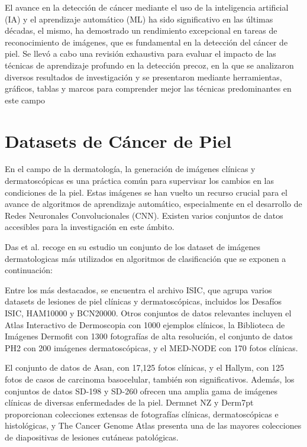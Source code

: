 El avance en la detección de cáncer mediante el uso de la inteligencia artificial (IA) y el aprendizaje automático (ML) ha sido significativo en 
las últimas décadas, el mismo, ha demostrado un rendimiento excepcional en tareas de reconocimiento de imágenes, que es fundamental en la detección 
del cáncer de piel. Se llevó a cabo una revisión exhaustiva para evaluar el impacto de las técnicas de aprendizaje profundo en la detección precoz, 
en la que se analizaron diversos resultados de investigación y se presentaron mediante herramientas, gráficos, tablas y marcos para comprender mejor 
las técnicas predominantes en este campo 

\section*{Datasets de Cáncer de Piel}

En el campo de la dermatología, la generación de imágenes clínicas y dermatoscópicas es una práctica común para supervisar los cambios en las condiciones de la piel. Estas imágenes se han vuelto un recurso crucial para el avance de algoritmos de aprendizaje automático, especialmente en el desarrollo de Redes Neuronales Convolucionales (CNN). Existen varios conjuntos de datos accesibles para la investigación en este ámbito.

Das et al.  recoge en su estudio un conjunto de los dataset de imágenes dermatologicas más utilizados en algoritmos de clasificación que se exponen a continuación:

Entre los más destacados, se encuentra el archivo ISIC, que agrupa varios datasets de lesiones de piel clínicas y dermatoscópicas, incluidos los Desafíos ISIC, HAM10000 y BCN20000. Otros conjuntos de datos relevantes incluyen el Atlas Interactivo de Dermoscopia con 1000 ejemplos clínicos, la Biblioteca de Imágenes Dermofit con 1300 fotografías de alta resolución, el conjunto de datos PH2 con 200 imágenes dermatoscópicas, y el MED-NODE con 170 fotos clínicas.

El conjunto de datos de Asan, con 17,125 fotos clínicas, y el Hallym, con 125 fotos de casos de carcinoma basocelular, también son significativos. Además, los conjuntos de datos SD-198 y SD-260 ofrecen una amplia gama de imágenes clínicas de diversas enfermedades de la piel. Dermnet NZ y Derm7pt proporcionan colecciones extensas de fotografías clínicas, dermatoscópicas e histológicas, y The Cancer Genome Atlas presenta una de las mayores colecciones de diapositivas de lesiones cutáneas patológicas.

